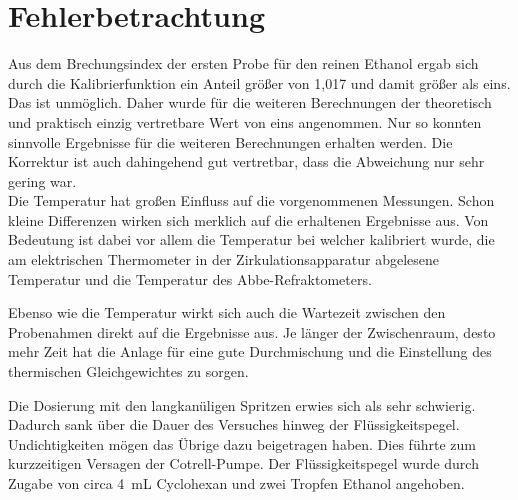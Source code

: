 \newpage
\section{Fehlerbetrachtung}
\label{sec:fehler}

Aus dem Brechungsindex der ersten Probe für den reinen Ethanol ergab sich durch die Kalibrierfunktion ein Anteil größer von 1,017 und damit größer als eins. Das ist unmöglich. Daher wurde für die weiteren Berechnungen der theoretisch und praktisch einzig vertretbare Wert von eins angenommen. Nur so konnten sinnvolle Ergebnisse für die weiteren Berechnungen erhalten werden. Die Korrektur ist auch dahingehend gut vertretbar, dass die Abweichung nur sehr gering war.\\


Die Temperatur hat großen Einfluss auf die vorgenommenen Messungen. Schon kleine Differenzen wirken sich merklich auf die erhaltenen Ergebnisse aus. Von Bedeutung ist dabei vor allem die Temperatur bei welcher kalibriert wurde, die am elektrischen Thermometer in der Zirkulationsapparatur abgelesene Temperatur und die Temperatur des Abbe-Refraktometers.

Ebenso wie die Temperatur wirkt sich auch die Wartezeit zwischen den Probenahmen direkt auf die Ergebnisse aus. Je länger der Zwischenraum, desto mehr Zeit hat die Anlage für eine gute Durchmischung und die Einstellung des thermischen Gleichgewichtes zu sorgen.

Die Dosierung mit den langkanüligen Spritzen erwies sich als sehr schwierig. Dadurch sank über die Dauer des Versuches hinweg der Flüssigkeitspegel. Undichtigkeiten mögen das Übrige dazu beigetragen haben. Dies führte zum kurzzeitigen Versagen der Cotrell-Pumpe. Der Flüssigkeitspegel wurde durch Zugabe von circa \SI{4}{\milli\liter} Cyclohexan und zwei Tropfen Ethanol angehoben. 


